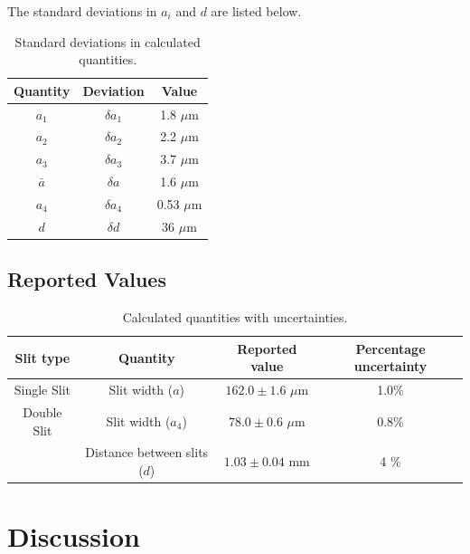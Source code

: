 \documentclass[11pt]{article}
\begin{document}
        The standard deviations in $a_i$ and $d$ are listed below.
        \begin{table}[H]
                \centering
                \caption{Standard deviations in calculated quantities.}
                \label{tab:deviations_calculated}
                \begin{tabular}{c|c|c}\hline
                Quantity        & Deviation     & Value         \\\hline\hline
                $a_1$           & $\delta a_1$  & 1.8 $\mu$m    \\
                $a_2$           & $\delta a_2$  & 2.2 $\mu$m    \\
                $a_3$           & $\delta a_3$  & 3.7 $\mu$m    \\
                $\bar{a}$       & $\delta a$    & 1.6 $\mu$m    \\
                $a_4$           & $\delta a_4$  & 0.53 $\mu$m   \\
                $d$             & $\delta d$    & 36 $\mu$m    \\\hline
                \end{tabular}
        \end{table}
        

        \subsection{Reported Values}
        \begin{table}[H]
                \centering
                \caption{Calculated quantities with uncertainties.}
                \label{tab:calculated_values}
                \begin{tabular}{c|c|c|c}\hline
                Slit type       &Quantity                       & Reported value        & Percentage uncertainty\\\hline\hline
                Single Slit     &Slit width ($a$)               & $162.0 \pm 1.6$ $\mu$m& 1.0\%         \\
                Double Slit     &Slit width ($a_4$)             & $78.0 \pm 0.6$ $\mu$m & 0.8\%         \\
                                &Distance between slits ($d$)   & $1.03 \pm 0.04$ mm    & 4 \%          \\\hline
                \end{tabular}
        \end{table}

        \section{Discussion}
        
\end{document}
